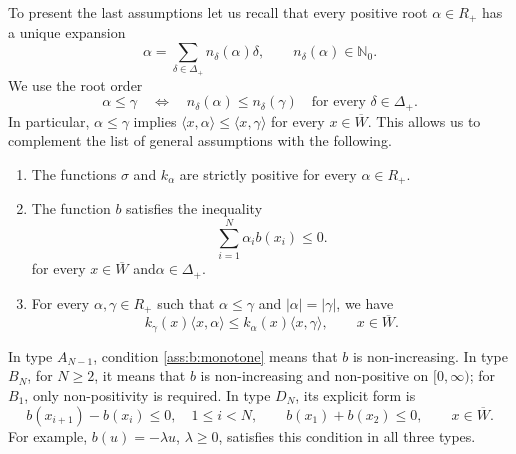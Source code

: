 \documentclass{article}
\numberwithin{equation}{section}
\newcommand{\Cc}{\overline{W}}
\newcommand{\SimplePlus}{\Delta_+}
\theoremstyle{plain}
\begin{document}
    To present the last assumptions let us recall that every positive root $\alpha\in R_+$ has a unique expansion
        \begin{equation*}
            \alpha=\sum_{\delta\in\SimplePlus}n_\delta(\alpha)\delta, \qquad n_\delta(\alpha)\in\mathbb N_{0}.
        \end{equation*}
    We use the root order
        \begin{equation*}
            \alpha\leq\gamma \quad\Longleftrightarrow\quad n_\delta(\alpha)\leq n_\delta(\gamma) \quad\text{for every }\delta\in\SimplePlus.
        \end{equation*} 
    In particular, $\alpha\leq\gamma$ implies $\langle x,\alpha\rangle\leq\langle x,\gamma\rangle$ for every $x\in\Cc$.
    This allows us to complement the list of general assumptions with the following. 
    \begin{enumerate}[label=(A\arabic*), leftmargin=2cm]
        \item \label{ass:sigma:k:positive} 
        The functions $\sigma$ and $k_\alpha$ are strictly positive for every $\alpha\in R_+$.
        \item \label{ass:b:monotone} 
        The function $b$ satisfies the inequality 
            \begin{equation*}
                \sum_{i=1}^N \alpha_i b(x_i)\leq0.
            \end{equation*}
        for every $x\in\Cc$ and$\alpha\in\SimplePlus$. 

    \item \label{ass:k:monotonicty}
        For every $\alpha,\gamma\in R_+$ such that $\alpha\leq\gamma$ and $|\alpha|=|\gamma|$, we have
            \begin{equation*}
                k_\gamma(x)\langle x,\alpha\rangle \leq k_\alpha(x)\langle x,\gamma\rangle, \qquad x\in\Cc.
            \end{equation*}    
\end{enumerate}
    In type $A_{N-1}$, condition \ref{ass:b:monotone} means that $b$ is non-increasing. In type $B_N$, for $N\geq2$, it means that $b$ is non-increasing and non-positive on $[0,\infty)$; for $B_1$, only non-positivity is required. In type $D_N$, its explicit form is
        \begin{equation*}
            b(x_{i+1})-b(x_i)\leq0,\quad 1\leq i<N, \qquad b(x_1)+b(x_2)\leq0, \qquad x\in\Cc.
        \end{equation*}
    For example, $b(u)=-\lambda u$, $\lambda\geq0$, satisfies this condition in all three types.
\end{document}
